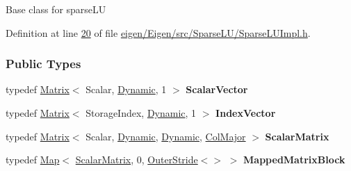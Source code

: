 Base class for sparse\+LU 

Definition at line \hyperlink{eigen_2_eigen_2src_2_sparse_l_u_2_sparse_l_u_impl_8h_source_l00020}{20} of file \hyperlink{eigen_2_eigen_2src_2_sparse_l_u_2_sparse_l_u_impl_8h_source}{eigen/\+Eigen/src/\+Sparse\+L\+U/\+Sparse\+L\+U\+Impl.\+h}.

\subsubsection*{Public Types}
\begin{DoxyCompactItemize}
\item 
\mbox{\label{group___sparse_l_u___module_a26f9fb6f3223dad4b18a27f42c7db62e}} 
typedef \hyperlink{group___core___module_class_eigen_1_1_matrix}{Matrix}$<$ Scalar, \hyperlink{namespace_eigen_ad81fa7195215a0ce30017dfac309f0b2}{Dynamic}, 1 $>$ {\bfseries Scalar\+Vector}
\item 
\mbox{\label{group___sparse_l_u___module_aa573839120675e129e912beac087d772}} 
typedef \hyperlink{group___core___module_class_eigen_1_1_matrix}{Matrix}$<$ Storage\+Index, \hyperlink{namespace_eigen_ad81fa7195215a0ce30017dfac309f0b2}{Dynamic}, 1 $>$ {\bfseries Index\+Vector}
\item 
\mbox{\label{group___sparse_l_u___module_aa26e66444befb13e4b78de402e740fb1}} 
typedef \hyperlink{group___core___module_class_eigen_1_1_matrix}{Matrix}$<$ Scalar, \hyperlink{namespace_eigen_ad81fa7195215a0ce30017dfac309f0b2}{Dynamic}, \hyperlink{namespace_eigen_ad81fa7195215a0ce30017dfac309f0b2}{Dynamic}, \hyperlink{group__enums_ggaacded1a18ae58b0f554751f6cdf9eb13a0cbd4bdd0abcfc0224c5fcb5e4f6669a}{Col\+Major} $>$ {\bfseries Scalar\+Matrix}
\item 
\mbox{\label{group___sparse_l_u___module_a49d4667303265643fcf2d28dbf7ae19b}} 
typedef \hyperlink{group___core___module_class_eigen_1_1_map}{Map}$<$ \hyperlink{group___core___module_class_eigen_1_1_matrix}{Scalar\+Matrix}, 0, \hyperlink{class_eigen_1_1_outer_stride}{Outer\+Stride}$<$$>$ $>$ {\bfseries Mapped\+Matrix\+Block}
\item 
\mbox{\label{group___sparse_l_u___module_a59f0f7d4c248cdcde9290d861e5477c0}} 
$$
\end{DoxyCompactItemize}
